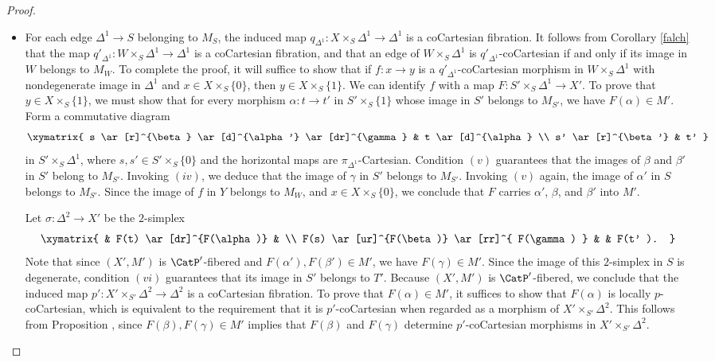 \begin{proof}
\begin{itemize}
\item[$(2)$] For each edge $\Delta^1 \rightarrow S$ belonging to $M_S$, the induced map
$q_{\Delta^1}: X \times_{S} \Delta^1 \rightarrow \Delta^1$ is a coCartesian fibration.
It follows from Corollary \ref{falch} that the map $q'_{\Delta^1}: W \times_{S} \Delta^1 \rightarrow \Delta^1$ is a coCartesian fibration, and that an edge of $W \times_{S} \Delta^1$ is
$q'_{\Delta^1}$-coCartesian if and only if its image in $W$ belongs to $M_{W}$.
To complete the proof, it will suffice to show that if $f: x \rightarrow y$ is
a $q'_{\Delta^1}$-coCartesian morphism in $W \times_{S} \Delta^1$ with nondegenerate
image in $\Delta^1$ and $x \in X \times_{S} \{0\}$, then $y \in X \times_{S} \{1\}$.
We can identify $f$ with a map $F: S' \times_{S} \Delta^1 \rightarrow X'$.
To prove that $y \in X \times_{S} \{1\}$, we must show that for every morphism
$\alpha: t \rightarrow t'$ in $S' \times_{S} \{1\}$ whose image in $S'$ belongs to $M_{S'}$, 
we have $F(\alpha) \in M'$. Form a commutative diagram
$$ \xymatrix{ s \ar[r]^{\beta} \ar[d]^{\alpha'} \ar[dr]^{\gamma} & t \ar[d]^{\alpha} \\
s' \ar[r]^{\beta'} & t' }$$
in $S' \times_{S} \Delta^1$, where $s,s' \in S' \times_{S} \{0\}$ and the horizontal maps
are $\pi_{\Delta^1}$-Cartesian. Condition $(v)$ guarantees that the images of $\beta$ and $\beta'$
in $S'$ belong to $M_{S'}$. Invoking $(iv)$, we deduce that the image of $\gamma$ in $S'$ belongs to $M_{S'}$. Invoking $(v)$ again, the image 
of $\alpha'$ in $S$ belongs to $M_{S'}$. 
Since the image of $f$ in $Y$ belongs to $M_W$, and $x \in X \times_{S} \{0\}$, we
conclude that $F$ carries $\alpha'$, $\beta$, and $\beta'$ into $M'$.

Let
$\sigma: \Delta^2 \rightarrow X'$ be the $2$-simplex 
$$ \xymatrix{ & F(t) \ar[dr]^{F(\alpha)} & \\
F(s) \ar[ur]^{F(\beta)} \ar[rr]^{ F(\gamma) } & & F(t' ). }$$ 
Note that since $(X',M')$ is $\CatP'$-fibered and $F(\alpha'), F(\beta') \in M'$, we have
$F(\gamma) \in M'$. Since the image of this $2$-simplex in $S$ is degenerate, condition $(vi)$ guarantees that its image in $S'$ belongs to $T'$. Because $(X', M')$ is $\CatP'$-fibered, we conclude that the induced map $p': X' \times_{S'} \Delta^2 \rightarrow \Delta^2$ is a coCartesian fibration.
To prove that $F( \alpha) \in M'$, it suffices to show that $F(\alpha)$ is
locally $p$-coCartesian, which is equivalent to the requirement that it is
$p'$-coCartesian when regarded as a morphism of $X' \times_{S'} \Delta^2$.
This follows from Proposition , since $F(\beta), F(\gamma) \in M'$
implies that $F(\beta)$ and $F(\gamma)$ determine $p'$-coCartesian morphisms
in $X' \times_{S'} \Delta^2$.


\end{itemize}
\end{proof}
